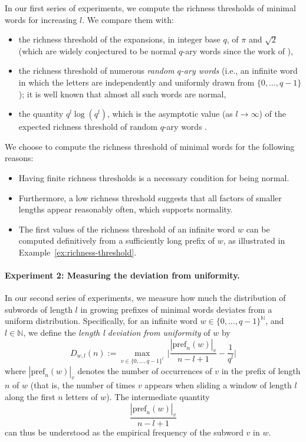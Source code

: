 \documentclass{template_arxiv}
\numberwithin{equation}{section}
\newcommand{\N}{\mathbb N}
\newcommand{\pref}{\mathrm{pref}}
\begin{document}
In our first series of experiments, we compute the richness thresholds of minimal words for increasing $l$. We compare them with:
\begin{itemize}
    \vspace{-0.2cm}\item[-] the richness threshold of the expansions, in integer base $q$, of $\pi$ and $\sqrt{2}$ (which are widely conjectured to be normal $q$-ary words since the work of \cite{Bor50}),
    \vspace{-0.2cm}\item[-] the richness threshold of numerous \emph{random $q$-ary words} (i.e., an infinite word in which the letters are independently and uniformly drawn from $\{0,\dots, q-1\}$); it is well known that almost all such words are normal,
    \vspace{-0.2cm}\item[-] the quantity $q^l\log(q^l)$, which is the asymptotic value (as $l\rightarrow \infty$) of the expected richness threshold of random $q$-ary words \cite{mor87}.
\end{itemize}
We choose to compute the richness threshold of minimal words for the following reasons:
	\begin{itemize}
	 \vspace{-0.2cm} \item[-] Having finite richness thresholds  is a necessary condition for being normal.
	 \vspace{-0.2cm} 	 
	 \item[-] Furthermore, a low richness threshold suggests that all factors of smaller lengths appear reasonably often, which supports normality.
	 \vspace{-0.2cm} \item[-] The first values of the richness threshold of an infinite word $w$ can be computed definitively from a sufficiently long prefix of $w$, as illustrated in Example~\ref{ex:richness-threshold}.	 
\end{itemize}
	

\paragraph{Experiment 2: Measuring the deviation from uniformity.}


In our second series of experiments, we measure how much the distribution of subwords of length $l$ in growing prefixes of minimal words deviates from a uniform distribution. 
Specifically, for an infinite word $w \in \{0,\dots,q-1\}^{\N}$, and $l \in\N$, we define the \emph{length l deviation from uniformity} of $w$ by
\begin{equation}\label{eq:def_dfu}
    D_{w,l}(n):=\underset{v\in\{0,\dots,q-1\}^l}{\max}\,\Big|\frac{|\pref_n(w)|_v}{n-l+1}-\frac{1}{q^l}\Big|
\end{equation}
where $|\pref_n(w)|_v$ denotes the number of occurrences of $v$ in the prefix of length $n$ of $w$ (that is, the number of times $v$ appears when sliding a window of length $l$ along the  first $n$ letters of $w$). The intermediate quantity 
\[ \frac{|\pref_n(w)|_v}{n-l+1}\]
can thus be understood as the empirical frequency of the subword $v$ in $w$. 
\end{document}
